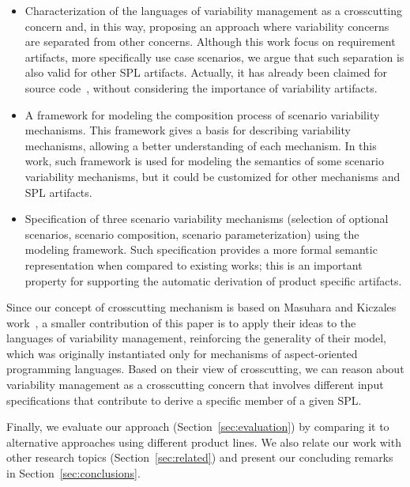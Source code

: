 \documentclass{acm_proc_article-sp}
\begin{document}
\begin{itemize}
\item Characterization of the languages of variability management as a crosscutting concern and, in this way, proposing an approach where variability concerns are separated from other concerns. Although this work focus on requirement artifacts, more specifically use case scenarios, we argue that such separation is also valid for other SPL artifacts. Actually, it has already been claimed for source code~\cite{Alves:2006aa,Apel:2006aa}, without considering the importance of variability artifacts.

\item A framework for modeling the composition process of scenario variability
mechanisms. This framework gives a basis for describing variability mechanisms,
allowing a better understanding of each mechanism. In this work, such framework
is used for modeling the semantics of some scenario variability mechanisms, but
it could be customized for other mechanisms and SPL artifacts.

\item Specification of three scenario variability mechanisms (selection of
optional scenarios, scenario composition, scenario parameterization) using the
modeling framework. Such specification provides a more formal semantic
representation when compared to existing works; this is an important property for
supporting the automatic derivation of product specific artifacts.
\end{itemize}

Since our concept of crosscutting mechanism is based on Masuhara and Kiczales
work~\cite{Masuhara:2003aa}, a smaller contribution of this paper is to apply
their ideas to the languages of variability management,  reinforcing the
generality of their model, which was originally instantiated only for mechanisms
of aspect-oriented programming languages. Based on their view of crosscutting, we
can reason about variability management as a crosscutting concern that involves
different input specifications that contribute to derive a specific member of a
given SPL.

Finally, we evaluate our approach (Section~\ref{sec:evaluation}) by comparing it
to alternative approaches using different product lines. We also relate our work
with other research topics (Section~\ref{sec:related}) and present our concluding
remarks in Section~\ref{sec:conclusions}.

\end{document}
